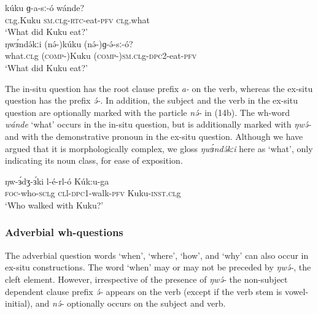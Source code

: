 \ea
\ea \gll	kúku	ɡ-a-sː-ó	wánde?\\
	\textsc{cl}g.Kuku	\textsc{sm.cl}g-\textsc{rtc}-eat-\textsc{pfv}   	\textsc{cl}g.what\\
\trans	‘What did Kuku eat?’\\
\ex \gll	ŋwɜ́ndə́kːi	(nə́-)kúku     	(nə́-)ɡ-ə́-sː-ó?                \\
	what.\textsc{cl}g	(\textsc{comp-})Kuku  	(\textsc{comp-})\textsc{sm.cl}g-\textsc{dpc}2-eat-\textsc{pfv}  \\
\trans	‘What did Kuku eat?’\\
\z
\z

The in-situ question has the root clause prefix \textit{a-} on the verb, whereas the ex-situ question has the prefix \textit{ə́-}. In addition, the subject and the verb in the ex-situ question are optionally marked with the particle \textit{nə́-} in (14b). The wh-word \textit{wánde} ‘what’ occurs in the in-situ question, but is additionally marked with \textit{ŋwə́-} and with the demonstrative pronoun in the ex-situ question. Although we have argued that it is morphologically complex, we gloss \textit{ŋwɜ́ndə́kːi} here as ‘what’, only indicating its noun class, for ease of exposition.


\ea \ea \gll  ŋw-ɜ́dʒ-ɜ́ki l-é-rl-ó Kúk:u-ga\\
\textsc{foc}-who-\textsc{scl}g \textsc{cl}l-\textsc{dpc1}-walk-\textsc{pfv} Kuku-\textsc{inst.cl}g\\
\glt `Who walked with Kuku?'
\z 
\z 

\subsubsection{Adverbial wh-questions}
The adverbial question words ‘when’, ‘where’, ‘how’, and ‘why’ can also occur in ex-situ constructions. The word ‘when’ may or may not be preceded by \textit{ŋwə́-}, the cleft element. However, irrespective of the presence of \textit{ŋwə́-} the non-subject dependent clause prefix \textit{ə́-} appears on the verb (except if the verb stem is vowel-initial), and \textit{nə́-} optionally occurs on the subject and verb. 

